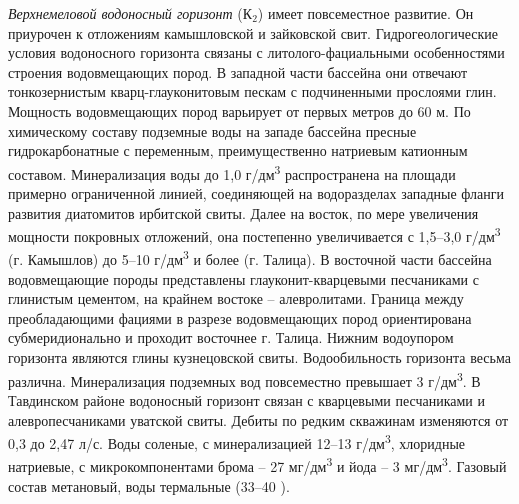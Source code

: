 \documentclass[a4paper,12pt]{article} %
\begin{document}
\textit{Верхнемеловой водоносный горизонт} ($К_2$) имеет повсеместное развитие. Он приурочен к отложениям камышловской и зайковской свит. Гидрогеологические условия водоносного горизонта связаны с литолого-фациальными особенностями строения водовмещающих пород. В западной части
бассейна они отвечают тонкозернистым кварц-глауконитовым пескам с подчиненными прослоями глин. Мощность водовмещающих пород варьирует от первых метров до 60 м. По химическому составу подземные воды
на западе бассейна пресные гидрокарбонатные с переменным, преимущественно натриевым катионным составом. Минерализация воды до 1,0 г/дм\textsuperscript{3} распространена на площади примерно ограниченной линией, соединяющей на водоразделах западные фланги развития диатомитов ирбитской свиты. Далее на восток, по мере увеличения мощности покровных отложений, она постепенно увеличивается с 1,5–3,0 г/дм\textsuperscript{3} (г. Камышлов) до
5–10 г/дм\textsuperscript{3} и более (г. Талица). В восточной части бассейна водовмещающие породы представлены глауконит-кварцевыми песчаниками с глинистым цементом, на крайнем востоке – алевролитами. Граница между преобладающими фациями в разрезе водовмещающих пород ориентирована субмеридионально и проходит восточнее г. Талица. Нижним водоупором горизонта являются глины кузнецовской свиты. Водообильность горизонта
весьма различна. Минерализация подземных вод повсеместно превышает 3 г/дм\textsuperscript{3}. В Тавдинском районе водоносный горизонт связан с кварцевыми песчаниками и алевропесчаниками уватской свиты. Дебиты по редким скважинам изменяются от 0,3 до 2,47 л/с. Воды соленые, с минерализацией 12–13 г/дм\textsuperscript{3}, хлоридные натриевые, с микрокомпонентами брома – 27 мг/дм\textsuperscript{3} и йода – 3 мг/дм\textsuperscript{3}. Газовый состав метановый, воды термальные (33–40 ).
\end{document}
